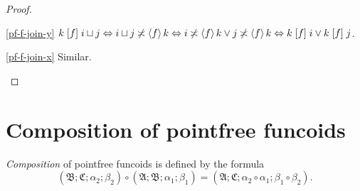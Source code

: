 \begin{proof}
~
\begin{widedisorder}
\item [{\ref{pf-f-join-y}}] $k\mathrel{\left[f\right]}i\sqcup j\Leftrightarrow i\sqcup j\not\asymp\left\langle f\right\rangle k\Leftrightarrow i\not\asymp\left\langle f\right\rangle k\lor j\not\asymp\left\langle f\right\rangle k\Leftrightarrow k\mathrel{\left[f\right]}i\lor k\mathrel{\left[f\right]}j$.
\item [{\ref{pf-f-join-x}}] Similar.
\end{widedisorder}
\end{proof}

\section{Composition of pointfree funcoids}
\begin{defn}
\emph{Composition} of pointfree
funcoids is defined by the formula 
\[
(\mathfrak{B};\mathfrak{C};\alpha_{2};\beta_{2})\circ(\mathfrak{A};\mathfrak{B};\alpha_{1};\beta_{1})=(\mathfrak{A};\mathfrak{C};\alpha_{2}\circ\alpha_{1};\beta_{1}\circ\beta_{2}).
\]

\end{defn}

